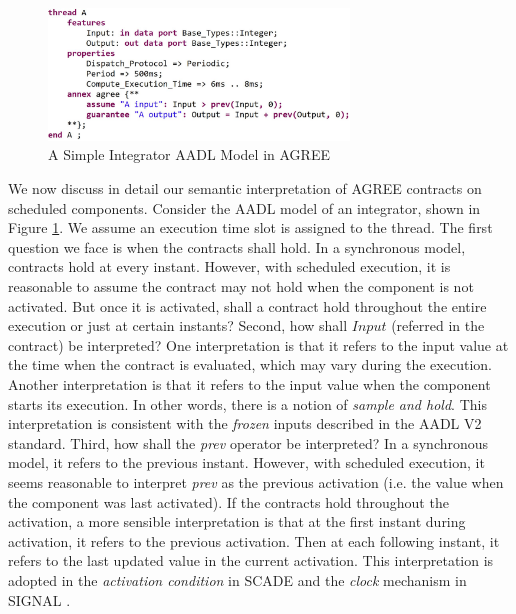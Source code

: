 \begin{figure}[ht!]
\centering
\includegraphics[width=80mm]{pre.jpg}
\caption{A Simple Integrator AADL Model in AGREE\label{integratorFig}}
\end{figure}

We now discuss in detail our semantic interpretation of AGREE contracts on scheduled components.
Consider the AADL model of an integrator, shown in Figure \ref{integratorFig}. We assume an execution time slot is assigned to the thread.  
The first question we face is when the contracts shall hold. In a synchronous model, contracts hold at every instant. However, with scheduled execution, it is reasonable to assume the contract may not hold when the component is not activated. But once it is activated, shall a contract hold throughout the entire execution or just at certain instants? Second, how shall $Input$ (referred in the contract) be interpreted? One interpretation is that it refers to the input value at the time when the contract is evaluated, which may vary during the execution. Another interpretation is that it refers to the input value when the component starts its execution. In other words, there is a notion of \emph{sample and hold}. This interpretation is consistent with the \emph{frozen} inputs described in the AADL V2 standard. Third, how shall the \emph{prev} operator be interpreted? In a synchronous model, it refers to the previous instant. However, with scheduled execution, it seems reasonable to interpret \emph{prev} as the previous activation (i.e. the value when the component was last activated). If the contracts hold throughout the activation, a more sensible interpretation is that at the first instant during activation, it refers to the previous activation. Then at each following instant, it refers to the last updated value in the current activation. This interpretation is adopted in the \emph{activation condition} in SCADE \cite{scade} and the \emph{clock} mechanism in SIGNAL \cite{signal}.

